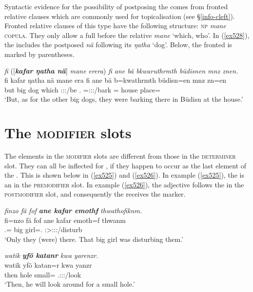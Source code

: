 Syntactic evidence for the possibility of postposing the  comes from fronted relative clauses which are commonly used for topicalisation (see \S{}\ref{info-cleft}). Fronted relative clauses of this type have the following structure: \textsc{np} \emph{mane} \textsc{copula}. They only allow a full  before the relative  \emph{mane} `which, who'. In (\ref{ex528}), the  includes the postposed   \emph{nä} following its  \emph{ŋatha} `dog'. Below, the fronted  is marked by parentheses.

\begin{exe}
	\ex \emph{fi} ([\emph{\textbf{kafar ŋatha nä}}] \emph{mane erera}) \emph{fi ane bä bkwaruthrmth büdisnen mnz znen.}\\
	\gll fi kafar ŋatha nä mane era fi ane bä b=kwathrmth büdisn=en mnz zn=en\\
	but big dog \Indf{} which \Stpl:\Sbj:\Pst:\Ipfv/be \Third.\Abs{} \Dem{} \Med{} \Med=\Stpl:\Sbj:\Pst:\Dur/bark \Pl=\Loc{} house place=\Loc\\
	\trans `But, as for the other big dogs, they were barking there in Büdisn at the house.'
	\label{ex528}
\end{exe}

\section{The \textsc{modifier} slots}\label{npsyntaxmodifier}

The elements in the \textsc{modifier} slots are different from those in the \textsc{determiner} slot. They can all be inflected for , if they happen to occur as the last element of the . This is shown below in (\ref{ex525}) and (\ref{ex526}). In example (\ref{ex525}), the  is an  in the \textsc{premodifier} slot. In example (\ref{ex526}), the adjective follows the  in the \textsc{postmodifier} slot, and consequently the  receives the  marker.

\begin{exe}
	\ex \emph{finzo fä fof \textbf{ane kafar emothf} thwathofiknm.}\\
	\gll fi=nzo fä fof ane kafar emoth=f thwanm\\
	\Third.\Abs=\Only{} \Dist{} \Emph{} \Dem{} big girl=\Erg.\Sg{} \Sg:\Sbj>\Stdu:\Obj:\Pst:\Dur/disturb\\
	\trans `Only they (were) there. That big girl was disturbing them.'\\
	\label{ex525}
\end{exe}
\begin{exe}
	\ex \emph{watik \textbf{yfö katanr} kwa yarenzr.}\\
	\gll watik yfö katan=r kwa yanzr\\
	then hole small=\Purp{} \Fut{} \Tsg.\Masc:\Sbj:\Nonpast:\Ipfv/look\\
	\trans `Then, he will look around for a small hole.'
	\label{ex526}
\end{exe}

